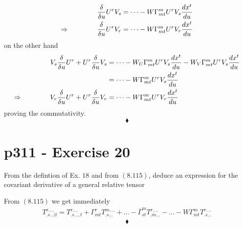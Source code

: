 \begin{align}
\fdv{}{u}U^rV_s &= \dots -W\Gamma^m_{mt}U^rV_s\dv{x^t}{u}\\
\Rightarrow \spatie \fdv{}{u}U^rV_r &= \dots -W\Gamma^m_{mt}U^rV_r\dv{x^t}{u}\\
\end{align}
on the other hand 
\begin{align}
V_s\fdv{}{u}U^r+ U^r\fdv{}{u}V_s &= \dots -W_U\Gamma^m_{mt}U^rV_s\dv{x^t}{u}-W_V\Gamma^m_{mt}U^rV_s\dv{x^t}{u}\\
&= \dots -W\Gamma^m_{mt}U^rV_s\dv{x^t}{u}\\
\Rightarrow \spatie V_r\fdv{}{u}U^r+ U^r\fdv{}{u}V_r &= \dots -W\Gamma^m_{mt}U^rV_r\dv{x^t}{u}\\
\end{align}
proving the commutativity.
$$\blacklozenge$$
\newpage




\section{p311 - Exercise 20}
\begin{tcolorbox}
From the defintion of Ex. $18$ and from $\mathbf{(8.115)}$, deduce an expression for the covariant derivative of a general relative tensor 
\end{tcolorbox}
From $\mathbf{(8.115)}$ we get immediately
\begin{align*}
T^{r . \dots}_{.s\dots|t} = T^{r . \dots}_{.s\dots,t}+\Gamma^r_{mt}T^{m . \dots}_{.s\dots}+ \dots -\overline{\Gamma}^m_{st}T^{r . \dots}_{.m\dots}-\dots -W\Gamma^m_{mt}T^{r . \dots}_{.s\dots}
\end{align*}
$$\blacklozenge$$
\newpage



